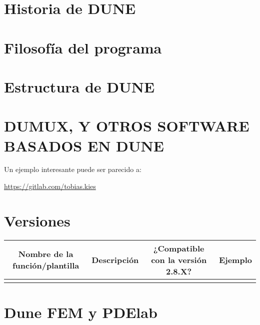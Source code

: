 \section{Historia de DUNE}


\section{Filosofía del programa}

\section{Estructura de DUNE}
\section{DUMUX, Y OTROS SOFTWARE BASADOS EN DUNE} %

Un ejemplo interesante puede ser parecido a:

\url{https://gitlab.com/tobias.kies}

\section{Versiones}


\begin{table}[ht!]
	\centering
	\begin{tabular}{|c|c|c|c|}
		\hline
		Nombre de la función/plantilla
		 &
		Descripción
		 &
		¿Compatible con la versión 2.8.X?
		 &
		Ejemplo   \\
		\hline
		 &   &  & \\
		\hline
	\end{tabular}
\end{table}

\section{Dune FEM y PDElab}